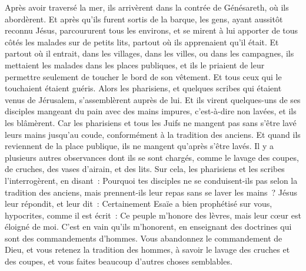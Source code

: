 \begin{multicols}{2}
Après avoir traversé la mer, ils arrivèrent dans la contrée de Génésareth, où ils abordèrent.
Et après qu'ils furent sortis de la barque, les gens, ayant aussitôt reconnu Jésus,
parcoururent tous les environs, et se mirent à lui apporter de tous côtés les malades sur de petits lits, partout où ils apprenaient qu'il était.
Et partout où il entrait, dans les villages, dans les villes, ou dans les campagnes, ils mettaient les malades dans les places publiques, et ils le priaient de leur permettre seulement de toucher le bord de son vêtement. Et tous ceux qui le touchaient étaient guéris.
\VerseOne{}Alors les pharisiens, et quelques scribes qui étaient venus de Jérusalem, s'assemblèrent auprès de lui.
Et ils virent quelques-uns de ses disciples mangeant du pain avec des mains impures, c'est-à-dire non lavées, et ils les blâmèrent.
Car les pharisiens et tous les Juifs ne mangent pas sans s'être lavé leurs mains jusqu'au coude, conformément à la tradition des anciens.
Et quand ils reviennent de la place publique, ils ne mangent qu'après s'être lavés. Il y a plusieurs autres observances dont ils se sont chargés, comme le lavage des coupes, de cruches, des vases d'airain, et des lits.
Sur cela, les pharisiens et les scribes l'interrogèrent, en disant~: Pourquoi tes disciples ne se conduisent-ils pas selon la tradition des anciens, mais prennent-ils leur repas sans se laver les mains~?
Jésus leur répondit, et leur dit~: Certainement Esaïe a bien prophétisé sur vous, hypocrites, comme il est écrit~: Ce peuple m'honore des lèvres, mais leur cœur est éloigné de moi.
C'est en vain qu'ils m'honorent, en enseignant des doctrines qui sont des commandements d'hommes.
Vous abandonnez le commandement de Dieu, et vous retenez la tradition des hommes, à savoir le lavage des cruches et des coupes, et vous faites beaucoup d'autres choses semblables.

\end{multicols}
